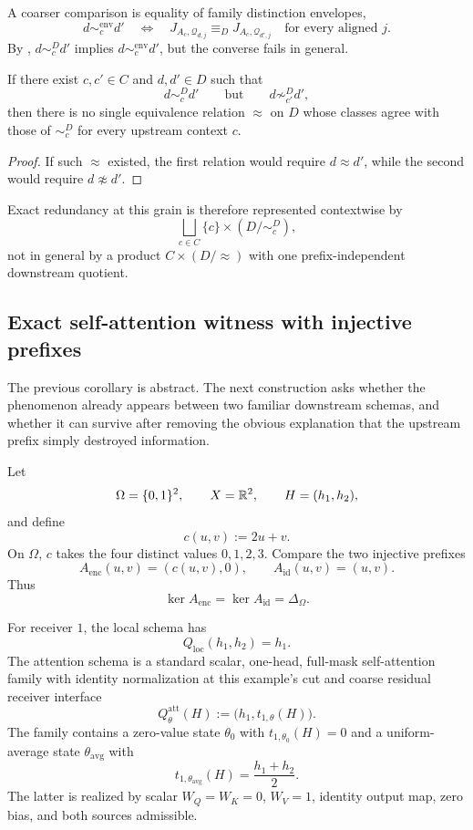 A coarser comparison is equality of family distinction envelopes,
\[
d\sim_c^{\mathrm{env}}d'
\quad\Longleftrightarrow\quad
J_{A_c,\mathcal Q_{d,j}}\equiv_DJ_{A_c,\mathcal Q_{d',j}}
\quad\text{for every aligned }j.
\]
By , $d\sim_c^Dd'$ implies $d\sim_c^{\mathrm{env}}d'$, but the converse fails in general.

\begin{corollary}\label{cor:no-fixed-quotient-v13}
If there exist $c,c'\in C$ and $d,d'\in D$ such that
\[
d\sim_c^D d'
\qquad\text{but}\qquad
d\not\sim_{c'}^D d',
\]
then there is no single equivalence relation $\approx$ on $D$ whose classes agree with those of $\sim_c^D$ for every upstream context $c$.
\end{corollary}

\begin{proof}
If such $\approx$ existed, the first relation would require $d\approx d'$, while the second would require $d\not\approx d'$.
\end{proof}

Exact redundancy at this grain is therefore represented contextwise by
\[
\boxed{
\bigsqcup_{c\in C}\{c\}\times(D/{\sim_c^D}),
}
\]
not in general by a product $C\times(D/{\approx})$ with one prefix-independent downstream quotient.

\subsection{Exact self-attention witness with injective prefixes}\label{subsec:attention-context-witness}

The previous corollary is abstract. The next construction asks whether the phenomenon already appears between two familiar downstream schemas, and whether it can survive after removing the obvious explanation that the upstream prefix simply destroyed information.

Let
\[
\Omega=\{0,1\}^2,
\qquad
X=\mathbb{R}^2,
\qquad
H=(h_1,h_2),
\]
and define
\[
c(u,v):=2u+v.
\]
On $\Omega$, $c$ takes the four distinct values $0,1,2,3$. Compare the two injective prefixes
\[
\boxed{
A_{\mathrm{enc}}(u,v)=(c(u,v),0),
\qquad
A_{\mathrm{id}}(u,v)=(u,v).
}
\]
Thus
\[
\ker A_{\mathrm{enc}}=\ker A_{\mathrm{id}}=\Delta_\Omega.
\]

For receiver $1$, the local schema has
\[
Q_{\mathrm{loc}}(h_1,h_2)=h_1.
\]
The attention schema is a standard scalar, one-head, full-mask self-attention family with identity normalization at this example's cut and coarse residual receiver interface
\[
Q^{\mathrm{att}}_{\theta}(H):=\bigl(h_1,t_{1,\theta}(H)\bigr).
\]
The family contains a zero-value state $\theta_0$ with $t_{1,\theta_0}(H)=0$ and a uniform-average state $\theta_{\mathrm{avg}}$ with
\[
t_{1,\theta_{\mathrm{avg}}}(H)=\frac{h_1+h_2}{2}.
\]
The latter is realized by scalar $W_Q=W_K=0$, $W_V=1$, identity output map, zero bias, and both sources admissible.

